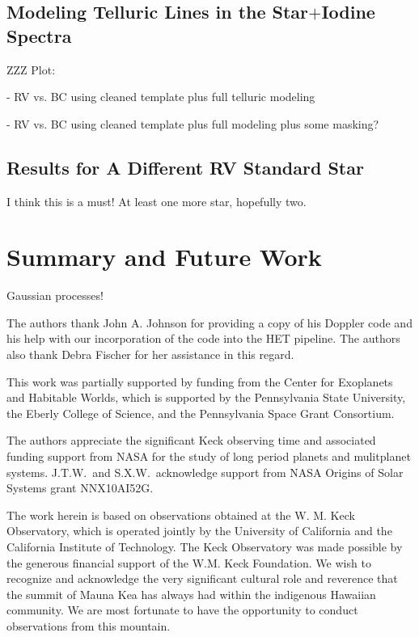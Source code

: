\documentclass{emulateapj}
\begin{document}
\begin{CJK*}{UTF8}{gbsn}
\subsection{Modeling Telluric Lines in the Star$+$Iodine Spectra}

ZZZ Plot:

- RV vs. BC using cleaned template plus full telluric modeling

- RV vs. BC using cleaned template plus full modeling plus some masking?


\subsection{Results for A Different RV Standard Star}

I think this is a must! At least one more star, hopefully two.


\section{Summary and Future Work}\label{sec:summary}

Gaussian processes!


\acknowledgements
The authors thank John A. Johnson for providing a copy of his Doppler
code and his help with our incorporation of the code into the HET
pipeline.  The authors also thank Debra Fischer for her assistance in
this regard.

This work was partially supported by funding from the Center for
Exoplanets and Habitable Worlds, which is supported by the
Pennsylvania State University, the Eberly College of Science, and the
Pennsylvania Space Grant Consortium.

The authors appreciate the significant Keck observing time and
associated funding support from NASA for the study of long period
planets and mulitplanet systems.
%
J.T.W.\ and S.X.W.\ acknowledge support from NASA Origins of Solar
Systems grant NNX10AI52G.

The work herein is based on observations obtained at the W. M. Keck
Observatory, which is operated jointly by the University of California
and the California Institute of Technology.  The Keck Observatory was
made possible by the generous financial support of the W.M. Keck
Foundation.  We wish to recognize and acknowledge the very significant
cultural role and reverence that the summit of Mauna Kea has always
had within the indigenous Hawaiian community.  We are most fortunate
to have the opportunity to conduct observations from this mountain.


\end{CJK*}
\end{document}
